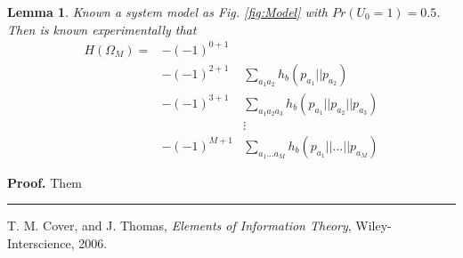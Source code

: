 \documentclass[a4paper,10pt]{article}
\newtheorem{mylemma}[mytheorem]{Lemma}
\newenvironment{myproof}[1][Proof]{\textbf{#1.} }{\ \rule{0.5em}{0.5em}}
\begin{document}
\begin{mylemma}
 \label{lemm:2}
  Known a system model as Fig. \ref{fig:Model} with $Pr(U_0=1)=0.5$. Then is known 
experimentally that
\begin{equation}
 \begin{matrix}
 H(\Omega_M)= & -(-1)^{0+1} & ~ \\
 ~            & -(-1)^{2+1} & \sum \limits_{a_1 a_2}     h_b(p_{a_1}||p_{a_2}) \\ 
 ~            & -(-1)^{3+1}  & \sum \limits_{a_1 a_2 a_3} h_b(p_{a_1}||p_{a_2}||p_{a_3}) \\ 
 ~            & ~ & \vdots \\
 ~            & -(-1)^{M+1}  & \sum \limits_{a_1 ... a_M} h_b(p_{a_1}|| ... ||p_{a_M}) 
 \end{matrix}
\end{equation}

\end{mylemma}
\begin{myproof}
Them
\end{myproof}

\begin{thebibliography}{99}
T. M. Cover, and J. Thomas, \textit{Elements of Information Theory}, Wiley-Interscience, 2006.

\end{thebibliography}
\end{document}
